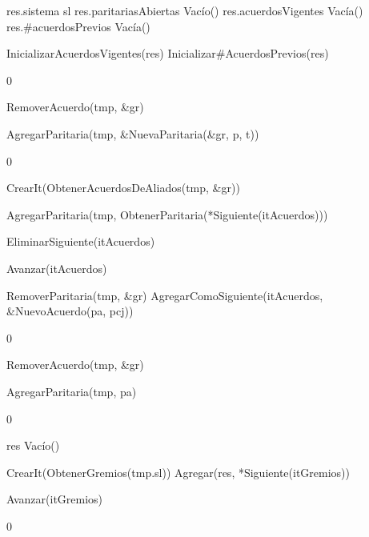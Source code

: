 {
	\state res.sistema \asig sl						
	\state res.paritariasAbiertas \asig Vacío()		
	\state res.acuerdosVigentes \asig Vacía()		
	\state res.\#acuerdosPrevios \asig Vacía()		
	\state

	\state InicializarAcuerdosVigentes(res)			
	\state Inicializar\#AcuerdosPrevios(res)				
}
{0}
{\addtocounter{lipsumcounter}{1}}

{
							
		\state RemoverAcuerdo(tmp, \&gr)							
	\endif
	\state

	\state AgregarParitaria(tmp, \&NuevaParitaria(\&gr, p, t))		
}
{0}
{\addtocounter{lipsumcounter}{1}}

{

	\state {} \asig CrearIt(ObtenerAcuerdosDeAliados(tmp, \&gr))		
			
		\state

		\state AgregarParitaria(tmp, ObtenerParitaria(*Siguiente(itAcuerdos)))		

		\state EliminarSiguiente(itAcuerdos)										

		\state
		\state Avanzar(itAcuerdos)													
	\endwhile
	\state

	\state {} \asig RemoverParitaria(tmp, \&gr)		
	\state AgregarComoSiguiente(itAcuerdos, \&NuevoAcuerdo(pa, pcj))			
}
{0}
{\addtocounter{lipsumcounter}{1}}

{
	\state {} \asig RemoverAcuerdo(tmp, \&gr)			

	\state AgregarParitaria(tmp, pa)											
}
{0}
{\addtocounter{lipsumcounter}{1}}

{
	\state res \asig Vacío()								

	\state
	\state {} \asig CrearIt(ObtenerGremios(tmp.sl))						
					
		\state
		\state Agregar(res, *Siguiente(itGremios))			

		\state
		\state Avanzar(itGremios)						
	\endwhile
}
{0}
{\addtocounter{lipsumcounter}{1}}

